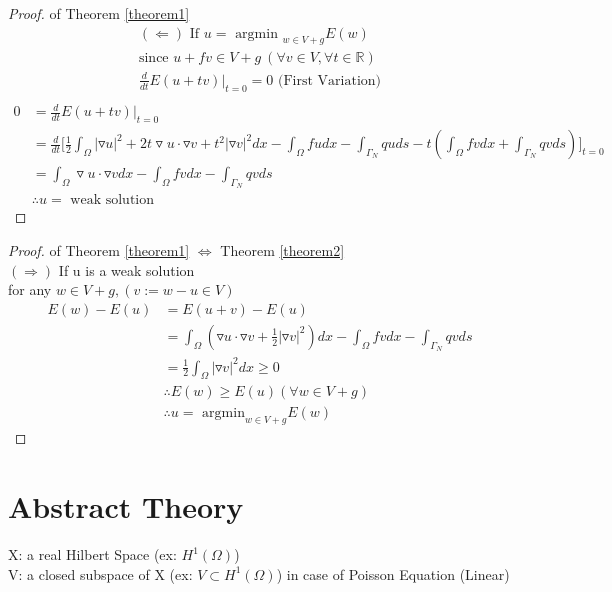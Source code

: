 \documentclass[a4paper,12pt]{article}
\newcommand{\R}{\mathbb{R}}
\begin{document}
\begin{proof}of Theorem \ref{theorem1}
	\begin{equation}\nonumber
	\begin{aligned}
		(\Leftarrow) \text{ If } u = \text{ argmin }_{w\in V+g} E(w)\\
		\text{since } u+fv \in V+g\ (\forall v \in V, \forall t\in \R)\\
		\frac{d}{dt} E(u+tv)|_{t=0} = 0 \text{ (First Variation)}\\
	\end{aligned}
	\end{equation}
	\begin{equation}\nonumber
	\begin{aligned}
	0 &= \frac{d}{dt} E(u+tv)|_{t=0}\\
	&= \frac{d}{dt}\bigg[ \frac{1}{2} \int_\Omega |\triangledown u|^2 + 2t \triangledown u \cdot \triangledown v + t^2 |\triangledown v|^2 dx - \int_\Omega fu dx -\int_{\Gamma_N} qu ds - t(\int_\Omega fv dx + \int_{\Gamma_N} qv ds) \bigg]_{t=0}\\
	&= \int_\Omega \triangledown u \cdot \triangledown v dx - \int_\Omega fv dx - \int_{\Gamma_N} qv ds\\
	&\therefore u=\text{ weak solution }
	\end{aligned}
	\end{equation}
\end{proof}
\begin{proof} of Theorem \ref{theorem1} $\Leftrightarrow$ Theorem \ref{theorem2}\\
	$(\Rightarrow)$ If u is a weak solution\\
	for any $w\in V+g,(v:= w-u \in V)$\\
	\begin{equation}\nonumber
	\begin{aligned}
	E(w) - E(u) &= E(u+v) - E(u)\\
	&= \int_\Omega(\triangledown u \cdot \triangledown v + \frac{1}{2} |\triangledown v|^2) dx - \int_\Omega fv dx -\int_{\Gamma_N} qv ds\\
	&= \frac{1}{2} \int_\Omega |\triangledown v|^2 dx \geq 0\\
	&\therefore E(w) \geq E(u) (\forall w \in V+g)\\
	&\therefore u = \text{ argmin}_{w\in V+g} E(w)
	\end{aligned}
	\end{equation}
\end{proof}
\section{Abstract Theory}
X: a real Hilbert Space (ex: $H^1(\Omega)$)\\
V: a closed subspace of X (ex: $V \subset H^1(\Omega)$) in case of Poisson Equation (Linear)
\end{document}
